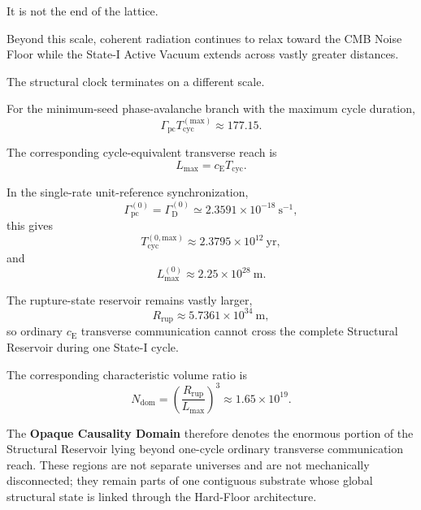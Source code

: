 It is not the end of the lattice.

Beyond this scale, coherent radiation continues to relax toward the CMB Noise Floor while the State-I Active Vacuum extends across vastly greater distances.

The structural clock terminates on a different scale.

For the minimum-seed phase-avalanche branch with the maximum cycle duration,
\begin{equation}
    \Gamma_{\mathrm{pc}} T_{\mathrm{cyc}}^{(\mathrm{max})} \approx 177.15.
\end{equation}

The corresponding cycle-equivalent transverse reach is
\begin{equation}
    L_{\mathrm{max}} = c_{\mathrm E} T_{\mathrm{cyc}}.
\end{equation}

In the single-rate unit-reference synchronization,
\begin{equation}
    \Gamma_{\mathrm{pc}}^{(0)} = \Gamma_{\mathrm D}^{(0)} \simeq 2.3591\times10^{-18}\ \mathrm{s^{-1}},
\end{equation}
this gives
\begin{equation}
    T_{\mathrm{cyc}}^{(0,\mathrm{max})} \approx 2.3795\times10^{12}\ \mathrm{yr},
\end{equation}
and
\begin{equation}
    L_{\mathrm{max}}^{(0)} \approx 2.25\times10^{28}\ \mathrm{m}.
\end{equation}

The rupture-state reservoir remains vastly larger,
\begin{equation}
    R_{\mathrm{rup}} \approx 5.7361\times10^{34}\ \mathrm{m},
\end{equation}
so ordinary $c_{\mathrm E}$ transverse communication cannot cross the complete Structural Reservoir during one State-I cycle.

The corresponding characteristic volume ratio is
\begin{equation}
    N_{\mathrm{dom}} = \left( \frac{R_{\mathrm{rup}}}{L_{\mathrm{max}}} \right)^3 \approx 1.65\times10^{19}.
\end{equation}

The \textbf{Opaque Causality Domain} therefore denotes the enormous portion of the Structural Reservoir lying beyond one-cycle ordinary transverse communication reach. These regions are not separate universes and are not mechanically disconnected; they remain parts of one contiguous substrate whose global structural state is linked through the Hard-Floor architecture.

